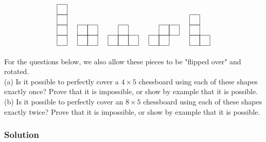 \documentclass{article}
\begin{document}
\[
\begin{tikzpicture}[scale=0.5] %

\begin{scope}
\foreach \y in {0,1,2,3} {
  \draw (0,\y) rectangle (1,\y+1);
}
\end{scope}

\begin{scope}[shift={(2,0)}]
\foreach \x in {0,1} {
  \foreach \y in {0,1} {
    \draw (\x,\y) rectangle (\x+1,\y+1);
  }
}
\end{scope}

\begin{scope}[shift={(5,0)}]
\draw (0,0) rectangle (1,1);
\draw (1,0) rectangle (2,1);
\draw (2,0) rectangle (3,1);
\draw (1,1) rectangle (2,2);
\end{scope}

\begin{scope}[shift={(9,0)}]
\draw (0,0) rectangle (1,1);
\draw (1,0) rectangle (2,1);
\draw (1,1) rectangle (2,2);
\draw (2,1) rectangle (3,2);
\end{scope}

\begin{scope}[shift={(13,0)}]
\draw (0,0) rectangle (1,1);
\draw (0,1) rectangle (1,2);
\draw (0,2) rectangle (1,3);
\draw (1,0) rectangle (2,1);
\end{scope}

\end{tikzpicture} \]

For the questions below, we also allow these pieces to be "flipped over" and rotated. \\

\noindent (a) Is it possible to perfectly cover a $4 \times 5$ chessboard using each of these shapes exactly once? Prove that it is impossible, or show by example that it is possible.\\

\noindent (b) Is it possible to perfectly cover an $8 \times 5$ chessboard using each of these shapes exactly twice? Prove that it is impossible, or show by example that it is possible.\\

\subsubsection*{Solution}
\end{document}

